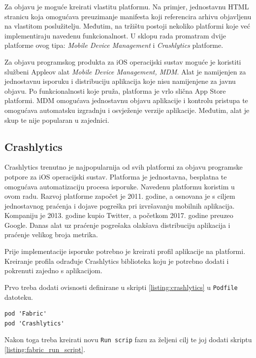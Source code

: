 \documentclass[times, utf8, diplomski, numeric]{fer}
\begin{document}
Za objavu je moguće kreirati vlastitu platformu. Na primjer, jednostavnu HTML stranicu koja omogućava preuzimanje manifesta koji referencira arhivu objavljenu na vlastitom poslužitelju. Međutim, na tržištu postoji nekoliko platformi koje već implementiraju navedenu funkcionalnost. U sklopu rada promatram dvije platforme ovog tipa: \textit{Mobile Device Management} i \textit{Crashlytics} platforme.

Za objavu programskog produkta za iOS operacijski sustav moguće je koristiti službeni Appleov alat \textit{Mobile Device Management, MDM}. Alat je namijenjen za jednostavnu isporuku i distribuciju aplikacija koje nisu namijenjene za javnu objavu. Po funkcionalnosti koje pruža, platforma je vrlo slična App Store platformi. MDM omogućava jednostavnu objavu aplikacije i kontrolu pristupa te omogućava automatsku izgradnju i osvježenje verzije aplikacije. Međutim, alat je skup te nije popularan u zajednici.

\subsection{Crashlytics}

Crashlytics trenutno je najpopularnija od svih platformi za objavu programske potpore za iOS operacijski sustav. Platforma je jednostavna, besplatna te omogućava automatizaciju procesa isporuke. Navedenu platformu koristim u ovom radu. Razvoj platforme započet je 2011. godine, a osnovana je s ciljem jednostavnog praćenja i dojave pogreška pri izvršavanju mobilnih aplikacija. Kompaniju je 2013. godine kupio Twitter, a početkom 2017. godine preuzeo Google. Danas alat uz praćenje pogrešaka olakšava distribuciju aplikacija i praćenje velikog broja metrika.

Prije implementacije isporuke potrebno je kreirati profil aplikacije na platformi. Kreiranje profila odrađuje Crashlytics biblioteka koju je potrebno dodati i pokrenuti zajedno s aplikacijom.

Prvo treba dodati ovisnosti definirane u skripti \ref{listing:crashlytics} u \verb|Podfile| datoteku.

\begin{lstlisting}[caption=Ovisnosti potrebne za objavu korištenjem Crashlytisc platforme, label=listing:crashlytics]
pod 'Fabric'
pod 'Crashlytics'
\end{lstlisting}

Nakon toga treba kreirati novu \verb|Run scrip| fazu za željeni cilj te joj dodati skriptu \ref{listing:fabric_run_script}.
\end{document}
